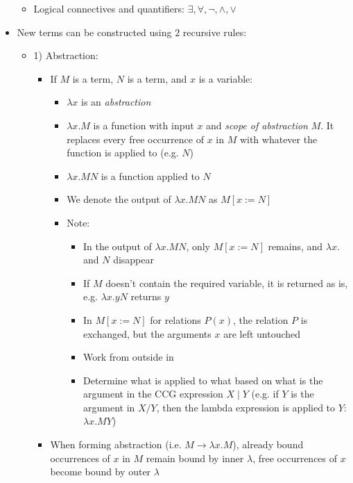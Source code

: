 \begin{itemize}
\begin{itemize}
        \item Logical connectives and quantifiers: $\exists, \forall, \neg, \land, \lor$
    \end{itemize}
    \item New terms can be constructed using $2$ recursive rules:
    \begin{itemize}
        \item 1) Abstraction:
        \begin{itemize}
            \item If $M$ is a term, $N$ is a term, and $x$ is a variable:
            \begin{itemize}
                \item $\lambda x$ is an \emph{abstraction}
                \item $\lambda x.M$ is a function with input $x$ and \emph{scope of abstraction} $M$. It replaces every free occurrence of $x$ in $M$ with whatever the function is applied to (e.g. $N$)
                \item $\lambda x.M N$ is a function applied to $N$
                \item We denote the output of $\lambda x.M N$ as $M[x := N]$
                \item Note: 
                \begin{itemize}
                    \item In the output of $\lambda x.M N$, only $M[x := N]$ remains, and $\lambda x.$ and $N$ disappear
                    \item If $M$ doesn't contain the required variable, it is returned as is, e.g. $\lambda x.y N$ returns $y$
                    \item In $M[x := N]$ for relations $P(x)$, the relation $P$ is exchanged, but the arguments $x$ are left untouched
                    \item Work from outside in
                    \item Determine what is applied to what based on what is the argument in the CCG expression $X \mid Y$ (e.g. if $Y$ is the argument in $X / Y$, then the lambda expression is applied to $Y$: $\lambda x.M Y$)
                \end{itemize}
            \end{itemize}
            \item When forming abstraction (i.e. $M \to \lambda x.M$), already bound occurrences of $x$ in $M$ remain bound by inner $\lambda$, free occurrences of $x$ become bound by outer $\lambda$

\end{itemize}
\end{itemize}
\end{itemize}
